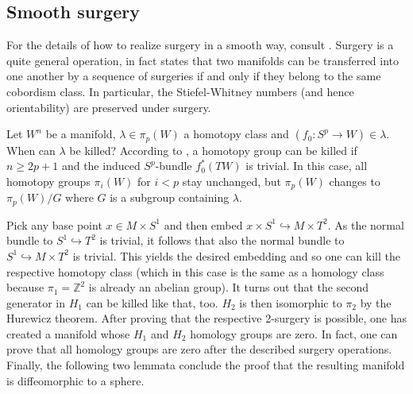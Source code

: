 
\subsection{Smooth surgery}
For the details of how to realize surgery in a smooth way, consult \cite[paragraph 1]{Milnor61}.
Surgery is a quite general operation, in fact \cite[Theorem 1]{Milnor61} states that two manifolds can be transferred 
into one another by a sequence of surgeries if and only if they belong to the same cobordism class.
In particular, the Stiefel-Whitney numbers (and hence orientability) are preserved under surgery.

Let $W^n$ be a manifold, $\lambda \in \pi_p(W)$ a homotopy class and $(f_0: S^p \to W)\in \lambda$. When can $\lambda$ be killed?
According to \cite[Lemma 3]{Milnor61}, a homotopy group can be killed if $n \geq 2p+1$ and the induced $S^p$-bundle $f_0^*(TW)$ is trivial.
In this case, all homotopy groups $\pi_i(W)$ for $i < p$ stay unchanged, but $\pi_p(W)$ changes to $\pi_p(W)/G$ where $G$ is a subgroup containing $\lambda$.

Pick any base point $x \in M \times S^1$ and then embed $x \times S^1 \hookrightarrow M \times T^2$.
As the normal bundle to $S^1 \hookrightarrow T^2$ is trivial, it follows that also the normal bundle to $S^1 \hookrightarrow M \times T^2$ is trivial.
This yields the desired embedding and so one can kill the respective homotopy class 
(which in this case is the same as a homology class because $\pi_1 = \mathbb Z^2$ is already an abelian group).
It turns out that the second generator in $H_1$ can be killed like that, too.
$H_2$ is then isomorphic to $\pi_2$ by the Hurewicz theorem.
After proving that the respective 2-surgery is possible, one has created a manifold whose $H_1$ and $H_2$ homology groups are zero.
In fact, one can prove that all homology groups are zero after the described surgery operations.
Finally, the following two lemmata conclude the proof that the resulting manifold is diffeomorphic to a sphere.

